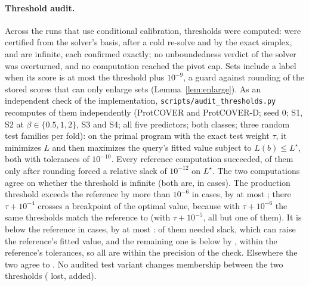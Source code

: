 \paragraph{Threshold audit.} Across the \certRuns{} runs that use conditional calibration, \certN{} thresholds were computed: \certFirst{} were certified from the solver's basis, \certResolve{} after a cold re-solve and \certSimplex{} by the exact simplex, and \certInf{} are infinite, each confirmed exactly; no unboundedness verdict of the solver was overturned, and no computation reached the pivot cap. Sets include a label when its score is at most the threshold plus $10^{-9}$, a guard against rounding of the stored scores that can only enlarge sets (Lemma~\ref{lem:enlarge}). As an independent check of the implementation, \texttt{scripts/audit\_thresholds.py} recomputes \auditN{} of them independently (ProtCOVER and ProtCOVER-D; seed 0; S1, S2 at $\beta\in\{0.5,1,2\}$, S3 and S4; all five predictors; both classes; three random test families per fold): on the primal program with the exact test weight $\tau$, it minimizes $L$ and then maximizes the query's fitted value subject to $L(b)\le L^\star$, both with tolerances of $10^{-10}$. Every reference computation succeeded, \auditSlack{} of them only after rounding forced a relative slack of $10^{-12}$ on $L^\star$. The two computations agree on whether the threshold is infinite (both are, in \auditBothInf{} cases). The production threshold exceeds the reference by more than $10^{-6}$ in \auditAbove{} cases, by at most \auditMaxDiff{}; there $\tau+10^{-4}$ crosses a breakpoint of the optimal value, because with $\tau+10^{-6}$ the same thresholds match the reference to \auditEpsSixDiff{} (with $\tau+10^{-5}$, all but one of them). It is below the reference in \auditBelow{} cases, by at most \auditMinDiff{}: \auditBelowSlack{} of them needed slack, which can raise the reference's fitted value, and the remaining one is below by \auditBelowNoSlackDiff{}, within the reference's tolerances, so all are within the precision of the check. Elsewhere the two agree to \auditRest{}. No audited test variant changes membership between the two thresholds (\auditLost{} lost, \auditAdded{} added).

